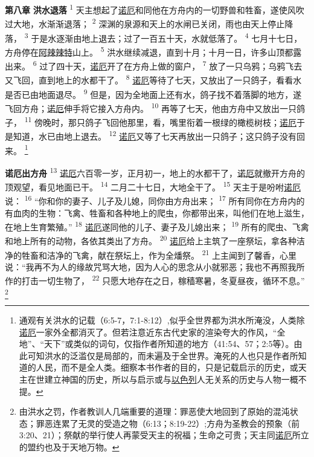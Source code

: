 \textbf{第八章 }
\textbf{洪水退落 }
\textsuperscript{1}
天主想起了\uline{诺厄}和同他在方舟内的一切野兽和牲畜，遂使风吹过大地，水渐渐退落；
\textsuperscript{2}
深渊的泉源和天上的水闸已关闭，雨也由天上停止降落，
\textsuperscript{3}
于是水逐渐由地上退去；过了一百五十天，水就低落了。
\textsuperscript{4}
七月十七日，方舟停在\uline{阿辣}\uline{辣特}山上。
\textsuperscript{5}
洪水继续减退，直到十月；十月一日，许多山顶都露出来。
\textsuperscript{6}
过了四十天，\uline{诺厄}开了在方舟上做的窗户，
\textsuperscript{7}
放了一只乌鸦；乌鸦飞去又飞回，直到地上的水都干了。
\textsuperscript{8}
\uline{诺厄}等待了七天，又放出了一只鸽子，看看水是否已由地面退尽。
\textsuperscript{9}
但是，因为全地面上还有水，鸽子找不着落脚的地方，遂飞回方舟；\uline{诺厄}伸手将它接入方舟内。
\textsuperscript{10}
再等了七天，他由方舟中又放出一只鸽子，
\textsuperscript{11}
傍晚时，那只鸽子飞回他那里，看，嘴里衔着一根绿的橄榄树枝；\uline{诺厄}于是知道，水已由地上退去。
\textsuperscript{12}
\uline{诺厄}又等了七天再放出一只鸽子；这只鸽子没有回来。
\footnote{通观有关洪水的记载（6:5-7，7:1-8:12）,似乎全世界都为洪水所淹没，人类除\uline{诺厄}一家外全都消灭了。但若注意近东古代史家的渲染夸大的作风，“全地”、“天下”或类似的词句，仅指作者所知道的地方（41:54、57；2:5等）。由此可知洪水的泛滥仅是局部的，而未遍及于全世界。淹死的人也只是作者所知道的人民，而不是全人类。细察本书作者的目的，只是记载启示的历史，或天主在世建立神国的历史，所以与启示或与\uline{以色列}人无关系的历史与人物一概不提。}

\textbf{诺厄出方舟 }
\textsuperscript{13}
\uline{诺厄}六百零一岁，正月初一，地上的水都干了，\uline{诺厄}就撤开方舟的顶观望，看见地面已干。
\textsuperscript{14}
二月二十七日，大地全干了。
\textsuperscript{15}
天主于是吩咐\uline{诺厄}说：
\textsuperscript{16}
“你和你的妻子、儿子及儿媳，同你由方舟出来；
\textsuperscript{17}
所有同你在方舟内的有血肉的生物：飞禽、牲畜和各种地上的爬虫，你都带出来，叫他们在地上滋生，在地上生育繁殖。”
\textsuperscript{18}
\uline{诺厄}遂同他的儿子、妻子及儿媳出来；
\textsuperscript{19}
所有的爬虫、飞禽和地上所有的动物，各依其类出了方舟。
\textsuperscript{20}
\uline{诺厄}给上主筑了一座祭坛，拿各种洁净的牲畜和洁净的飞禽，献在祭坛上，作为全燔祭。
\textsuperscript{21}
上主闻到了馨香，心里说：“我再不为人的缘故咒骂大地，因为人心的思念从小就邪恶；我也不再照我所作的打击一切生物了，
\textsuperscript{22}
只愿大地存在之日，稼穑寒暑，冬夏昼夜，循环不息。”
\footnote{由洪水之罚，作者教训人几端重要的道理：罪恶使大地回到了原始的混沌状态；罪恶连累了无灵的受造之物（6:13；8:19-22）;方舟为圣教会的预象（前3:20、21）；祭献的举行使人再蒙受天主的祝福；生命之可贵；天主同\uline{诺厄}所立的盟约也及于天地万物。}


